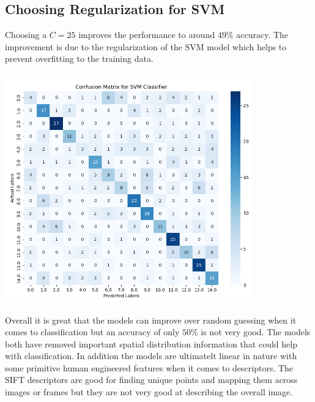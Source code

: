 \documentclass[12pt]{article}
\begin{document}
\subsection*{Choosing Regularization for SVM}

Choosing a $C=25$ improves the performance to around $49\%$ accuracy. The improvement is due to the regularization of the SVM model which helps to prevent overfitting to the training data.

\begin{center}
  \includegraphics[width=0.8\textwidth]{imgs/svm.png} 
\end{center}

Overall it is great that the models can improve over random guessing when it comes to classification but an accuracy of only $50\%$ is not very good. The models both have removed important spatial distribution information that could help with classification. In addition the models are ultimatelt linear in nature with some primitive human engineered features when it comes to descriptors. The SIFT descriptors are good for finding unique points and mapping them across images or frames but they are not very good at describing the overall image.
\end{document}
